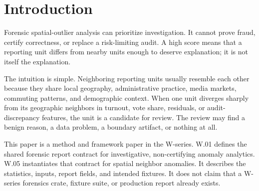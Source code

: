 \section{Introduction}

Forensic spatial-outlier analysis can prioritize investigation. It cannot prove
fraud, certify correctness, or replace a risk-limiting audit. A high score means
that a reporting unit differs from nearby units enough to deserve explanation;
it is not itself the explanation.

The intuition is simple. Neighboring reporting units usually resemble each other
because they share local geography, administrative practice, media markets,
commuting patterns, and demographic context. When one unit diverges sharply from
its geographic neighbors in turnout, vote share, residuals, or audit-discrepancy
features, the unit is a candidate for review. The review may find a benign
reason, a data problem, a boundary artifact, or nothing at all.

This paper is a method and framework paper in the W-series. W.01 defines the
shared forensic report contract for investigative, non-certifying anomaly
analytics. W.05 instantiates that contract for spatial neighbor anomalies. It
describes the statistics, inputs, report fields, and intended fixtures. It does
not claim that a W-series forensics crate, fixture suite, or production report
already exists.
